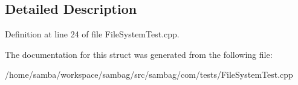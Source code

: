 \subsection{Detailed Description}


Definition at line 24 of file FileSystemTest.cpp.



The documentation for this struct was generated from the following file:\begin{DoxyCompactItemize}
\item 
/home/samba/workspace/sambag/src/sambag/com/tests/FileSystemTest.cpp\end{DoxyCompactItemize}
